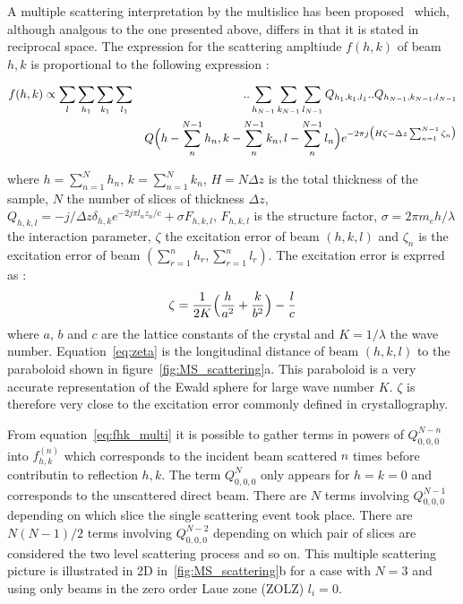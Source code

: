 A multiple scattering interpretation by the multislice has been
proposed~\cite{CowleyMoodie1957} which, although analgous to the
one presented above, differs in that it is stated in reciprocal space.
The expression for the scattering ampltiude $f(h,k)$ of beam $h,k$ is
proportional to the following expression :
%
\begin{widetext}
\begin{eqnarray}
  f(h,k) \propto
    \sum_{l}\sum_{h_1}\sum_{k_1}\sum_{l_1}
  &&..\sum_{h_{N-1}}\sum_{k_{N-1}}\sum_{l_{N-1}}
    Q_{h_1,k_1,l_1}..Q_{h_{N-1},k_{N-1},l_{N-1}}\nonumber\\
  &&Q\Bigl(h-\sum_{n}^{N-1}h_n,k-\sum_{n}^{N-1}k_n,l-\sum_{n}^{N-1}l_n\Bigr)
    e^{-2\pi j\bigl(H\zeta - \Delta z\sum_{n=1}^{N-1}\zeta_n\bigr)}\label{eq:fhk_multi}
\end{eqnarray}
\end{widetext}
%
where $h=\sum_{n=1}^N h_n$, $k=\sum_{n=1}^N k_n$,
$H=N\Delta z$ is the total thickness of the sample,
$N$ the number of slices of thickness $\Delta z$,
$Q_{h,k,l}=-j/\Delta z\delta_{h,k}e^{-2j\pi l_n z_n/c} + \sigma F_{h,k,l}$,
$F_{h,k,l}$ is the structure factor,
$\sigma=2\pi m_eh/\lambda$ the interaction parameter,
$\zeta$ the excitation error of beam $(h,k,l)$ and
$\zeta_n$ is the excitation error of beam
$\left(\sum_{r=1}^{n} h_r,\sum_{r=1}^n l_r\right)$.
The excitation error is exprred as :
%
\begin{equation}\label{eq:zeta}
  \zeta = \frac{1}{2K}\Bigl(\frac{h}{a^2} + \frac{k}{b^2}\Bigr) - \frac{l}{c}
\end{equation}
%
where $a$, $b$ and $c$ are the lattice constants of the crystal and
$K=1/\lambda$ the wave number.
Equation~\eqref{eq:zeta} is the longitudinal distance of beam $(h,k,l)$ to
the paraboloid shown in figure~\ref{fig:MS_scattering}a.
This paraboloid is a very accurate representation of the Ewald sphere for
large wave number $K$. $\zeta$ is therefore very close to the excitation
error commonly defined in crystallography.

From equation~\eqref{eq:fhk_multi} it is possible to gather terms in
powers of $Q_{0,0,0}^{N-n}$ into $f_{h,k}^{(n)}$ which corresponds to the
incident beam scattered $n$ times before contributin to reflection $h,k$.
The term $Q_{0,0,0}^N$ only appears for $h=k=0$ and corresponds to the
unscattered direct beam.
There are $N$ terms involving $Q_{0,0,0}^{N-1}$ depending on which slice
the single scattering event took place.
There are $N(N-1)/2$ terms involving $Q_{0,0,0}^{N-2}$ depending on which
pair of slices are considered the two level scattering process and so on.
This multiple scattering picture is illustrated in 2D in~\ref{fig:MS_scattering}b
for a case with $N=3$ and using only beams in the zero order Laue zone (ZOLZ)
$l_i=0$.

